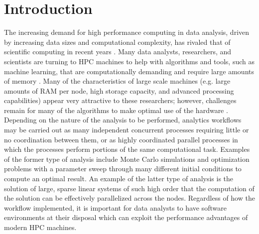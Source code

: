 \graphicspath{{plots/}}
\section{Introduction}

The increasing demand for high performance computing in data analysis, driven by
increasing data sizes and computational complexity, has rivaled that of scientific
computing in recent years \cite{fox:bdBenchmarking, kouzes:paradigm}. Many data analysts,
researchers, and scientists are turning to HPC machines to help with algorithms and tools,
such as machine learning, that are computationally demanding and require large amounts of
memory \cite{raj:hpcBigData}. Many of the characteristics of large scale machines (e.g.
large amounts of RAM per node, high storage capacity, and advanced processing
capabilities) appear very attractive to these researchers; however, challenges remain for
many of the algorithms to make optimal use of the hardware \cite{lee:model}. Depending on
the nature of the analysis to be performed, analytics workflows may be carried out as many
independent concurrent processes requiring little or no coordination between them, or as
highly coordinated parallel processes in which the processes perform portions of the same
computational task. Examples of the former type of analysis include Monte Carlo
simulations and optimization problems with a parameter sweep through many different
initial conditions to compute an optimal result.  An example of the latter type of
analysis is the solution of large, sparse linear systems of such high order that the
computation of the solution can be effectively parallelized across the nodes.
Regardless of how the workflow implemented, it is important for data analysts to have
software environments at their disposal which can exploit the performance advantages of
modern HPC machines.

